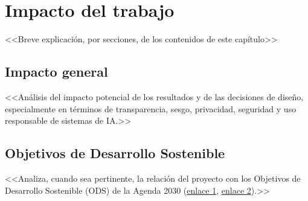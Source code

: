\chapter{Impacto del trabajo} \label{chp:impacto}

<<Breve explicación, por secciones, de los contenidos de este capítulo>>


\section{Impacto general} \label{sct:impacto:general}

<<Análisis del impacto potencial de los resultados y de las decisiones de diseño, especialmente en términos de transparencia, sesgo, privacidad, seguridad y uso responsable de sistemas de IA.>>


\section{Objetivos de Desarrollo Sostenible} \label{sct:impacto:ods}

<<Analiza, cuando sea pertinente, la relación del proyecto con los Objetivos de Desarrollo Sostenible (ODS) de la Agenda 2030 (\href{https://www.un.org/sustainabledevelopment/es/objetivos-de-desarrollo-sostenible/}{enlace 1}, \href{https://www.agenda2030.gob.es/objetivos/home.htm}{enlace 2}).>>
